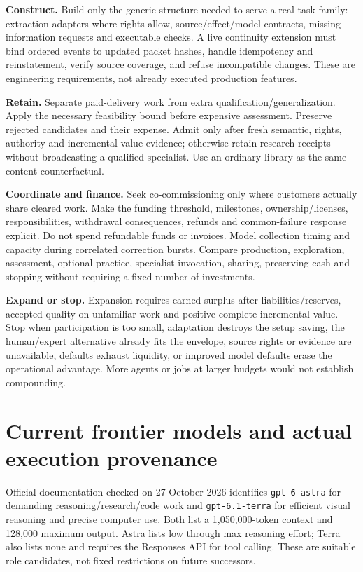 \textbf{Construct.} Build only the generic structure needed to serve a real task family: extraction adapters where rights allow, source/effect/model contracts, missing-information requests and executable checks. A live continuity extension must bind ordered events to updated packet hashes, handle idempotency and reinstatement, verify source coverage, and refuse incompatible changes. These are engineering requirements, not already executed production features.

\textbf{Retain.} Separate paid-delivery work from extra qualification/generalization. Apply the necessary feasibility bound before expensive assessment. Preserve rejected candidates and their expense. Admit only after fresh semantic, rights, authority and incremental-value evidence; otherwise retain research receipts without broadcasting a qualified specialist. Use an ordinary library as the same-content counterfactual.

\textbf{Coordinate and finance.} Seek co-commissioning only where customers actually share cleared work. Make the funding threshold, milestones, ownership/licenses, responsibilities, withdrawal consequences, refunds and common-failure response explicit. Do not spend refundable funds or invoices. Model collection timing and capacity during correlated correction bursts. Compare production, exploration, assessment, optional practice, specialist invocation, sharing, preserving cash and stopping without requiring a fixed number of investments.

\textbf{Expand or stop.} Expansion requires earned surplus after liabilities/reserves, accepted quality on unfamiliar work and positive complete incremental value. Stop when participation is too small, adaptation destroys the setup saving, the human/expert alternative already fits the envelope, source rights or evidence are unavailable, defaults exhaust liquidity, or improved model defaults erase the operational advantage. More agents or jobs at larger budgets would not establish compounding.

\section{Current frontier models and actual execution provenance}

Official documentation checked on 27 October 2026 identifies \texttt{gpt-6-astra} for demanding reasoning/research/code work and \texttt{gpt-6.1-terra} for efficient visual reasoning and precise computer use. Both list a 1,050,000-token context and 128,000 maximum output. Astra lists low through max reasoning effort; Terra also lists none and requires the Responses API for tool calling. These are suitable role candidates, not fixed restrictions on future successors.\citep{astra,terra}

